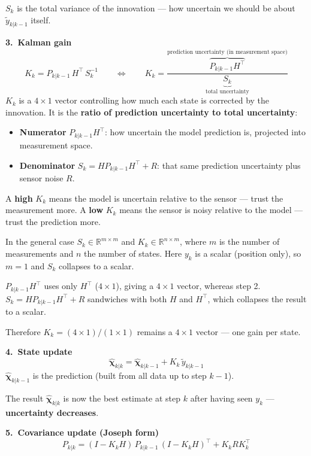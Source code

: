 \documentclass[12pt, a4paper]{article}
\begin{document}
$S_k$ is the total variance of the innovation --- how uncertain we
should be about $\tilde{y}_{k|k-1}$ itself.

\medskip
\textbf{3.\ Kalman gain}
\[
  K_k = P_{k|k-1}\,H^\top\,S_k^{-1}
  \qquad\Longleftrightarrow\qquad
  K_k = \frac{\overbrace{P_{k|k-1}H^\top}^{\text{prediction uncertainty (in measurement space)}}}
             {\underbrace{S_k}_{\text{total uncertainty}}}
\]
$K_k$ is a $4\times1$ vector controlling how much each state is corrected by the innovation.
It is the \textbf{ratio of prediction uncertainty to total uncertainty}:
\begin{itemize}[leftmargin=1.4em]
  \item \textbf{Numerator} $P_{k|k-1}H^\top$: how uncertain the model prediction is, projected into measurement space.
  \item \textbf{Denominator} $S_k = HP_{k|k-1}H^\top + R$: that same prediction uncertainty plus sensor noise $R$.
\end{itemize}
A \textbf{high} $K_k$ means the model is uncertain relative to the sensor --- trust the measurement more.
A \textbf{low} $K_k$ means the sensor is noisy relative to the model --- trust the prediction more.

\begin{warnbox}
  In the general case $S_k \in \mathbb{R}^{m\times m}$ and $K_k \in \mathbb{R}^{n\times m}$,
  where $m$ is the number of measurements and $n$ the number of states.
  Here $y_k$ is a scalar (position only), so $m=1$ and $S_k$ collapses to a scalar.

  $P_{k|k-1}H^\top$ uses only $H^\top$ ($4\times1$), giving a $4\times1$ vector,
  whereas step 2. $S_k = HP_{k|k-1}H^\top + R$ sandwiches with both $H$ and $H^\top$,
  which collapses the result to a scalar.

  Therefore $K_k = (4\times1)/(1\times1)$ remains a $4\times1$ vector --- one gain per state.
\end{warnbox}
\textbf{4.\ State update}
\[
  \hat{\boldsymbol{\chi}}_{k|k} = \hat{\boldsymbol{\chi}}_{k|k-1} + K_k\,\tilde{y}_{k|k-1}
\]
$\hat{\boldsymbol{\chi}}_{k|k-1}$ is the prediction (built from all data up
to step $k-1$).

The result $\hat{\boldsymbol{\chi}}_{k|k}$ is now the best estimate
at step $k$ after having seen $y_k$ --- \textbf{uncertainty decreases}.

\textbf{5.\ Covariance update (Joseph form)}
\[
  P_{k|k} = (I - K_k H)\,P_{k|k-1}\,(I - K_k H)^\top + K_k R K_k^\top
\]
\end{document}
